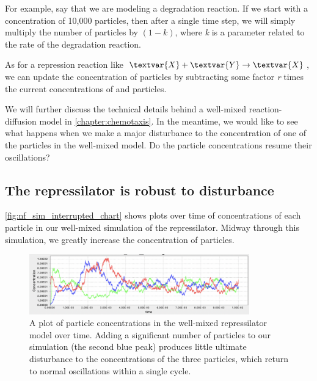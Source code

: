 For example, say that we are modeling a degradation reaction. If we start with a concentration of 10,000  particles, then after a single time step, we will simply multiply the number of  particles by $(1-k)$, where \textit{k} is a parameter related to the rate of the degradation reaction.

As for a repression reaction like $\textvar{X} + \textvar{Y} \rightarrow \textvar{X}$, we can update the concentration of  particles by subtracting some factor \textit{r} times the current concentrations of  and  particles.

We will further discuss the technical details behind a well-mixed reaction-diffusion model in \autoref{chapter:chemotaxis}. In the meantime, we would like to see what happens when we make a major disturbance to the concentration of one of the particles in the well-mixed model. Do the particle concentrations resume their oscillations?

\FloatBarrier
{}
\subsection{The repressilator is robust to disturbance}

\autoref{fig:nf_sim_interrupted_chart} shows plots over time of concentrations of each particle in our well-mixed simulation of the repressilator.  Midway through this simulation, we greatly increase the concentration of  particles.

\begin{figure}[h]
\centering
\mySfFamily
\includegraphics[width = 0.85\textwidth]{../images/nf_sim_interrupted_chart.png}
\caption{A plot of particle concentrations in the well-mixed repressilator model over time. Adding a significant number of  particles to our simulation (the second blue peak) produces little ultimate disturbance to the concentrations of the three particles, which return to normal oscillations within a single cycle.}
\label{fig:nf_sim_interrupted_chart}
\end{figure}

